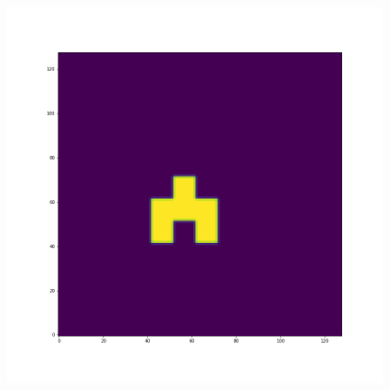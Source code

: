 \documentclass[12pt,a4paper]{article}
\begin{document}
\begin{figure}[H]
\begin{minipage}{.3\textwidth}
\end{minipage}%
\begin{minipage}{.3\textwidth}
  \centering
  \includegraphics[width=\linewidth]{Pictures/Solve2DWhiteBearMovementTestTHINC/Solve2DWhiteBearMovementTest_t20.png}
\end{minipage}
\end{figure}
\end{document}

